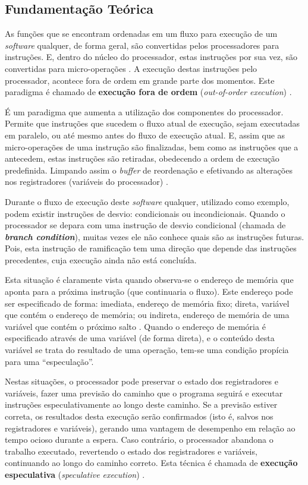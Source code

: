 \documentclass[
	article,			    %
	12pt,				    %
	oneside,			    %
	a4paper,			    %
	chapter=TITLE,		    %
	section=TITLE,		    %
	subsection=TITLE,	    %
	english,			    %
	brazil,				    %
	sumario=tradicional
]{abntex2}
\begin{document}
\subsection{Fundamentação Teórica}
As funções que se encontram ordenadas em um fluxo para execução de um \emph{software} qualquer, de forma geral, são convertidas pelos processadores para instruções. E, dentro do núcleo do processador, estas instruções por sua vez, são convertidas para micro-operações \cite{Alisson2017Introducao}. A execução destas instruções pelo processador, acontece fora de ordem em grande parte dos momentos. Este paradigma é chamado de \textbf{execução fora de ordem} (\emph{out-of-order execution}) \cite{Fog2017Microarchitecture}.

É um paradigma que aumenta a utilização dos componentes do processador. Permite que instruções que sucedem o fluxo atual de execução, sejam executadas em paralelo, ou até mesmo antes do fluxo de execução atual. E, assim que as micro-operações de uma instrução são finalizadas, bem como as instruções que a antecedem, estas instruções são retiradas, obedecendo a ordem de execução predefinida. Limpando assim o \emph{buffer} de reordenação e efetivando as alterações nos registradores (variáveis do processador) \cite{Kocher2018Spectre}.

Durante o fluxo de execução deste \emph{software} qualquer, utilizado como exemplo, podem existir instruções de desvio: condicionais ou incondicionais. Quando o processador se depara com uma instrução de desvio condicional (chamada de \textbf{\emph{branch condition}}), muitas vezes ele não conhece quais são as instruções futuras. Pois, esta instrução de ramificação tem uma direção que depende das instruções precedentes, cuja execução ainda não está concluída. 

Esta situação é claramente vista quando observa-se o endereço de memória que aponta para a próxima instrução (que continuaria o fluxo). Este endereço pode ser especificado de forma: imediata, endereço de memória fixo; direta, variável que contém o endereço de memória; ou indireta, endereço de memória de uma variável que contém o próximo salto \cite{Debarshi2018Addressing}. Quando o endereço de memória é especificado através de uma variável (de forma direta), e o conteúdo desta variável se trata do resultado de uma operação, tem-se uma condição propícia para uma ``especulação''.

Nestas situações, o processador pode preservar o estado dos registradores e variáveis, fazer uma previsão do caminho que o programa seguirá e executar instruções especulativamente ao longo deste caminho. Se a previsão estiver correta, os resultados desta execução serão confirmados (isto é, salvos nos registradores e variáveis), gerando uma vantagem de desempenho em relação ao tempo ocioso durante a espera. Caso contrário, o processador abandona o trabalho executado, revertendo o estado dos registradores e variáveis, continuando ao longo do caminho correto. Esta técnica é chamada de \textbf{execução especulativa} (\emph{speculative execution}) \cite{Kocher2018Spectre}.
\end{document}
